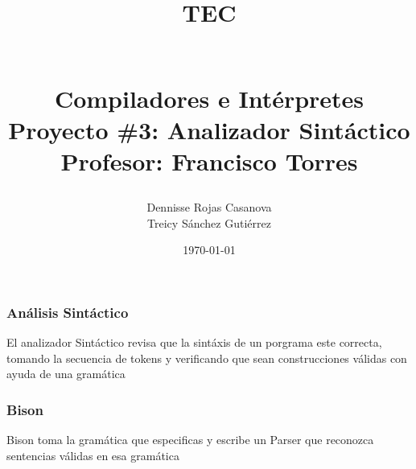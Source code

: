 \documentclass[8, usernames, dvipsnames]{beamer}
\begin{document}
 
\title{
\begin{Large}
TEC
\end{Large}
\newline
\begin{Large}
\\Compiladores e Int\'erpretes
\\Proyecto \#3: Analizador Sint\'actico
\\Profesor: Francisco Torres
\end{Large}
}
\author{Dennisse Rojas Casanova
\\Treicy S\'anchez Guti\'errez}
\date{\today}
\maketitle 
\begin{frame} 
\begin{center}
\frametitle{An\'alisis Sint\'actico} 
El analizador Sint\'actico revisa que la sint\'axis de un porgrama este correcta, tomando la secuencia de tokens y verificando que sean construcciones v\'alidas con ayuda de una gram\'atica\end{center}
\end{frame} 
\begin{frame} 
\begin{center}
\frametitle{Bison} 
Bison toma la gram\'atica que especificas y escribe un Parser que reconozca sentencias v\'alidas en esa gram\'atica\end{center}
\end{frame} 
\end{document}
